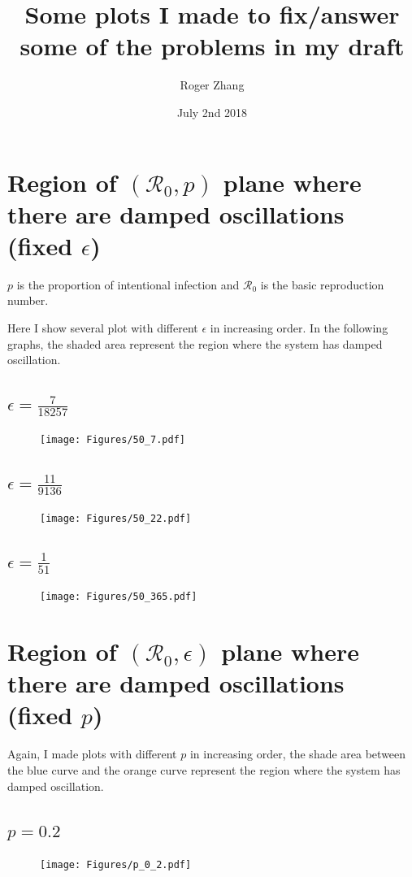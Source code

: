 \documentclass[12pt]{article}
\title{Some plots I made to fix/answer some of the problems in my draft}
\author{Roger Zhang}
\date{July 2nd 2018}
\newcommand{\R}{\mathcal{R}}
\begin{document}
\maketitle
\clearpage

\section{Region of $(\R_0,p)$ plane where there are damped
  oscillations (fixed $\epsilon$)}

$p$ is the proportion of intentional infection and $\R_0$ is the basic reproduction number.

Here I show several plot with different $\epsilon$ in increasing order. In the following graphs, the shaded area represent the region where the system has damped oscillation.
\subsection{$\epsilon=\frac{7}{18257}$}
\begin{figure}[H]
  \caption{}
  \centering
  \texttt{[image: Figures/50\_7.pdf]}
\end{figure}

\subsection{$\epsilon=\frac{11}{9136}$}
\begin{figure}[H]
  \caption{}
  \centering
  \texttt{[image: Figures/50\_22.pdf]}
\end{figure}

  \subsection{$\epsilon=\frac{1}{51}$}
\begin{figure}[H]
  \caption{}
  \centering
  \texttt{[image: Figures/50\_365.pdf]}
\end{figure}
\clearpage

\section{Region of $(\R_0,\epsilon)$ plane where there are damped
  oscillations (fixed $p$)}

Again, I made plots with different $p$ in increasing order, the shade area between the blue curve and the orange curve represent the region where the system has damped oscillation.
\subsection{$p=0.2$}
\begin{figure}[H]
  \caption{}
  \centering
  \texttt{[image: Figures/p\_0\_2.pdf]}
\end{figure}
\end{document}
